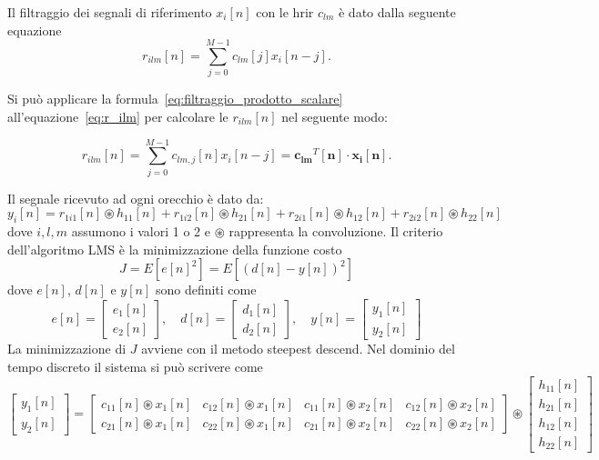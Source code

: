 \documentclass[12pt,a4paper,titlepage]{article}
\begin{document}
Il filtraggio dei segnali di riferimento $x_i[n]$ con le hrir $c_{lm}$ è dato dalla seguente equazione
\begin{equation}\label{eq:r_ilm}
r_{ilm}[n]=\sum_{j=0}^{M-1}c_{lm}[j]x_i[n-j].
\end{equation}

Si può applicare la formula~\eqref{eq:filtraggio_prodotto_scalare} all'equazione~\eqref{eq:r_ilm} per calcolare le $r_{ilm}[n]$ nel seguente modo:

\begin{equation}\label{eq:r_ilm_prodotto_scalare}
r_{ilm}[n]=\sum_{j=0}^{M-1}c_{lm,j}[n]x_i[n-j] = \mathbf{c_{lm}}^T[\mathbf{n}] \cdot \mathbf{x_i}[\mathbf{n}].
\end{equation}

Il segnale ricevuto ad ogni orecchio è dato da:
\begin{equation}\label{eq:y_i_lms}
y_i[n]=r_{1i1}[n] \circledast h_{11}[n]+r_{1i2}[n] \circledast h_{21}[n]+
r_{2i1}[n] \circledast h_{12}[n]+r_{2i2}[n] \circledast h_{22}[n]
\end{equation}
dove $i,l,m$ assumono i valori 1 o 2 e $\circledast$ rappresenta la convoluzione. Il criterio dell'algoritmo LMS è la minimizzazione della funzione costo
\begin{equation}\label{eq:errore_lms}
J=E[e[n]^2]=E[(d[n]-y[n])^2]
\end{equation}
dove $e[n]$, $d[n]$ e $y[n]$ sono definiti come
\begin{equation}
e[n]=
\begin{bmatrix}
e_1[n]\\
e_2[n]
\end{bmatrix},\quad
d[n]=
\begin{bmatrix}
d_1[n]\\
d_2[n]
\end{bmatrix},\quad
y[n]=
\begin{bmatrix}
y_1[n]\\
y_2[n]
\end{bmatrix}
\end{equation}
La minimizzazione di $J$ avviene con il metodo steepest descend.
Nel dominio del tempo discreto il sistema si può scrivere come
\begin{equation}\label{eq:y_lms}
\begin{bmatrix}
	y_1[n]     \\
	y_2[n]    
\end{bmatrix}
= 
\begin{bmatrix}
	c_{11}[n] \circledast x_1[n]  &  c_{12}[n] \circledast x_1[n]  & c_{11}[n] \circledast x_2[n]  & c_{12}[n] \circledast x_2[n]    \\
	c_{21}[n] \circledast x_1[n]  &  c_{22}[n] \circledast x_1[n]  & c_{21}[n] \circledast x_2[n]  & c_{22}[n] \circledast x_2[n]     
\end{bmatrix} 
\circledast
\begin{bmatrix}
	h_{11}[n] \\
	h_{21}[n] \\
	h_{12}[n] \\
	h_{22}[n]  
\end{bmatrix}
\end{equation}
\end{document}
